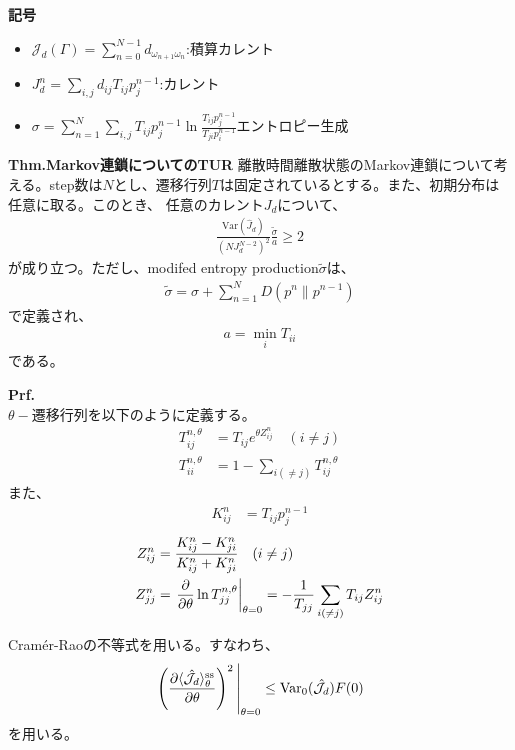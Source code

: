 \documentclass[a4paper,11pt]{jsarticle}
\numberwithin{equation}{section}
\begin{document}
\textbf{記号}
\begin{itemize}
    \item $\mathcal{J}_d(\Gamma) = \sum_{n=0}^{N-1} d_{\omega_{n+1}\omega_n}$:積算カレント
    \item $J_d^n = \sum_{i,j} d_{ij} T_{ij} p_{j}^{n-1}$:カレント
    \item $\sigma = \sum_{n=1}^{N} \sum_{i,j} T_{ij} p_{j}^{n-1} \ln \frac{T_{ij} p_{j}^{n-1}}{T_{ji} p_{i}^{n-1}}$エントロピー生成
\end{itemize}

\begin{itembox}[l]{\textbf{Thm.Markov連鎖についてのTUR}}
    離散時間離散状態のMarkov連鎖について考える。step数は$N$とし、遷移行列$T$は固定されているとする。また、初期分布は任意に取る。このとき、
    任意のカレント$J_{d}$について、
    \begin{align}
        \frac{\text{Var}(\hat{J}_{d})}{(NJ_{d}^{N-2})^2} \frac{\tilde{\sigma}}{a} \geq 2    
    \end{align}
    が成り立つ。ただし、modifed entropy production$\tilde{\sigma}$は、
    \begin{align}
        \tilde{\sigma} = \sigma + \sum_{n=1}^{N} D(p^n \| p^{n-1})
    \end{align}
    で定義され、
    \begin{align}
        a = \min_{i} T_{ii}
    \end{align}
    である。
\end{itembox}
\textbf{Prf.}\\
$\theta-$遷移行列を以下のように定義する。
\begin{align}
    T_{ij}^{n,\theta} &= T_{ij}e^{\theta Z_{ij}^n} \quad (i \neq j)\\
    T_{ii}^{n,\theta} &= 1 - \sum_{i(\neq j)} T_{ij}^{n,\theta}
\end{align}
また、
\begin{align}
    K_{ij}^n &= T_{ij}p_j^{n-1} 
\end{align}
\begin{align}
    Z_{ij}^n &= \frac{K_{ij}^n - K_{ji}^n}{K_{ij}^n + K_{ji}^n} \quad (i \neq j)\\
    Z_{jj}^n &=\left.\pdv{\theta}\ln{T_{jj}^{n,\theta}}\right|_{\theta = 0} = -\frac{1}{T_{jj}}\sum_{i(\neq j)}T_{ij} Z_{ij}^n
\end{align}

Cram\'er-Raoの不等式を用いる。すなわち、
\begin{align}
    \eval{\left( \frac{\partial \langle {\hat{\mathcal{J}}_{d}} \rangle_\theta^{\text{ss}}}{\partial \theta} \right)^2}_{\theta = 0}
    \leq \mathrm{Var}_{0} (\hat{\mathcal{J}}_{d}) F(0) \label{eq:2}
    \end{align}
    を用いる。
\end{document}
